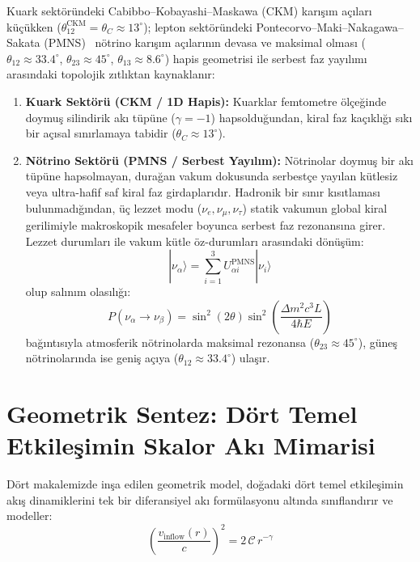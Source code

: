 \documentclass[11pt,a4paper]{article}
\begin{document}
Kuark sektöründeki Cabibbo--Kobayashi--Maskawa (CKM) karışım açıları küçükken ($\theta_{12}^{\mathrm{CKM}} = \theta_C \approx 13^\circ$); lepton sektöründeki Pontecorvo--Maki--Nakagawa--Sakata (PMNS)~\cite{pmns1962} nötrino karışım açılarının devasa ve maksimal olması ($\theta_{12} \approx 33.4^\circ$, $\theta_{23} \approx 45^\circ$, $\theta_{13} \approx 8.6^\circ$) hapis geometrisi ile serbest faz yayılımı arasındaki topolojik zıtlıktan kaynaklanır:
\begin{enumerate}
    \item \textbf{Kuark Sektörü (CKM / 1D Hapis):} Kuarklar femtometre ölçeğinde doymuş silindirik akı tüpüne ($\gamma = -1$) hapsolduğundan, kiral faz kaçıklığı sıkı bir açısal sınırlamaya tabidir ($\theta_C \approx 13^\circ$).
    \item \textbf{Nötrino Sektörü (PMNS / Serbest Yayılım):} Nötrinolar doymuş bir akı tüpüne hapsolmayan, durağan vakum dokusunda serbestçe yayılan kütlesiz veya ultra-hafif saf kiral faz girdaplarıdır. Hadronik bir sınır kısıtlaması bulunmadığından, üç lezzet modu ($\nu_e, \nu_\mu, \nu_\tau$) statik vakumun global kiral gerilimiyle makroskopik mesafeler boyunca serbest faz rezonansına girer. Lezzet durumları ile vakum kütle öz-durumları arasındaki dönüşüm:
          \begin{equation}
              |\nu_\alpha\rangle = \sum_{i=1}^3 U_{\alpha i}^{\mathrm{PMNS}} |\nu_i\rangle
              \label{eq:pmns_donusum_p4}
          \end{equation}
          olup salınım olasılığı:
          \begin{equation}
              P(\nu_\alpha \to \nu_\beta) = \sin^2(2\theta) \sin^2\left( \frac{\Delta m^2 c^3 L}{4 \hbar E} \right)
              \label{eq:notrino_salinim_p4}
          \end{equation}
          bağıntısıyla atmosferik nötrinolarda maksimal rezonansa ($\theta_{23} \approx 45^\circ$), güneş nötrinolarında ise geniş açıya ($\theta_{12} \approx 33.4^\circ$) ulaşır.
\end{enumerate}

\section{Geometrik Sentez: Dört Temel Etkileşimin Skalor Akı Mimarisi}
\label{sec:buyuk_sentez}

Dört makalemizde inşa edilen geometrik model, doğadaki dört temel etkileşimin akış dinamiklerini tek bir diferansiyel akı formülasyonu altında sınıflandırır ve modeller:
\begin{equation}
    \boxed{ \left( \frac{v_{\mathrm{inflow}}(r)}{c} \right)^2 = 2 \, \mathcal{C} \, r^{-\gamma} }
    \label{eq:master_sentez}
\end{equation}
\end{document}
